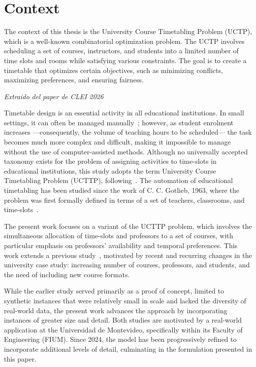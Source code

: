 
\section{Context}


The context of this thesis is the University Course Timetabling Problem (UCTP), which is a well-known combinatorial optimization problem. The UCTP involves scheduling a set of courses, instructors, and students into a limited number of time slots and rooms while satisfying various constraints. The goal is to create a timetable that optimizes certain objectives, such as minimizing conflicts, maximizing preferences, and ensuring fairness.


\textit{Extraido del paper de CLEI 2026}

Timetable design is an essential activity in all educational institutions.
In small settings, it can often be managed manually~\cite{chavez2020modeling};
however, as student enrolment increases —consequently, the volume of teaching hours to be scheduled—
the task becomes much more complex and difficult,
making it impossible to manage without the use of computer-assisted methods. 
Although no universally accepted taxonomy exists for the problem of assigning activities to time-slots in educational institutions,
this study adopts the term University Course Timetabling Problem (UCTTP), following~\cite{schaerf1999survey}.
The automation of educational timetabling has been studied since the work of C. C. Gotlieb, 1963,
where the problem was first formally defined in terms of a set of teachers, classrooms, and time-slots~\cite{gotlieb1963}.

The present work focuses on a variant of the UCTTP problem, 
which involves the simultaneous allocation of time-slots and professors to a set of courses, 
with particular emphasis on professors' availability and temporal preferences.
This work extends a previous study~\cite{zunino2024automated}, motivated by recent and recurring changes in the university case study: increasing number of courses, professors, and students, and the need of including new course formats.

While the earlier study served primarily as a proof of concept, 
limited to synthetic instances that were relatively small in scale and lacked the diversity of real-world data, the present work advances the approach by incorporating instances of greater size and detail.
Both studies are motivated by a real-world application at the Universidad de Montevideo, 
specifically within its Faculty of Engineering (FIUM). 
Since 2024, the model has been progressively refined to incorporate additional levels of detail, culminating in the formulation presented in this paper.

